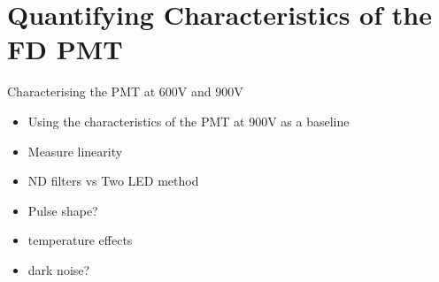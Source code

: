 \chapter{Quantifying Characteristics of the FD PMT}\label{Ch:PMTCharacter}

Characterising the PMT at 600V and 900V
\begin{itemize}
\item Using the characteristics of the PMT at 900V as a baseline
\item Measure linearity
\item ND filters vs Two LED method
\item Pulse shape?
\item temperature effects
\item dark noise?
\end{itemize}